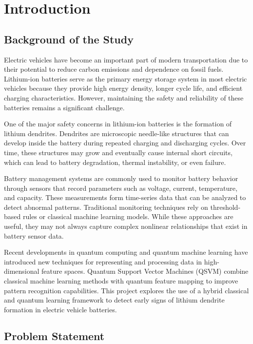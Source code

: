 \chapter{Introduction}

\section{Background of the Study}

Electric vehicles have become an important part of modern transportation due to their potential to reduce carbon emissions and dependence on fossil fuels. Lithium-ion batteries serve as the primary energy storage system in most electric vehicles because they provide high energy density, longer cycle life, and efficient charging characteristics. However, maintaining the safety and reliability of these batteries remains a significant challenge.

One of the major safety concerns in lithium-ion batteries is the formation of lithium dendrites. Dendrites are microscopic needle-like structures that can develop inside the battery during repeated charging and discharging cycles. Over time, these structures may grow and eventually cause internal short circuits, which can lead to battery degradation, thermal instability, or even failure.

Battery management systems are commonly used to monitor battery behavior through sensors that record parameters such as voltage, current, temperature, and capacity. These measurements form time-series data that can be analyzed to detect abnormal patterns. Traditional monitoring techniques rely on threshold-based rules or classical machine learning models. While these approaches are useful, they may not always capture complex nonlinear relationships that exist in battery sensor data.

Recent developments in quantum computing and quantum machine learning have introduced new techniques for representing and processing data in high-dimensional feature spaces. Quantum Support Vector Machines (QSVM) combine classical machine learning methods with quantum feature mapping to improve pattern recognition capabilities. This project explores the use of a hybrid classical and quantum learning framework to detect early signs of lithium dendrite formation in electric vehicle batteries.

\section{Problem Statement}

